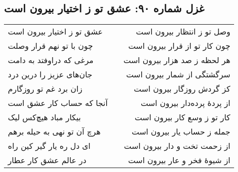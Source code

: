 \begin{center}
\section*{غزل شماره ۹۰: عشق تو ز اختیار بیرون است}
\label{sec:090}
\begin{longtable}{l p{0.5cm} r}
عشق تو ز اختیار بیرون است
&&
وصل تو ز انتظار بیرون است
\\
چون با تو نهم قرار وصلت
&&
چون کار تو از قرار بیرون است
\\
مرغی که دراوفتد به دامت
&&
هر لحظه ز صد هزار بیرون است
\\
جان‌های عزیز را درین درد
&&
سرگشتگی از شمار بیرون است
\\
زان برد غم تو روزگارم
&&
کز گردش روزگار بیرون است
\\
آنجا که حساب کار عشق است
&&
از پردهٔ پرده‌دار بیرون است
\\
بیکار مباد هیچ‌کس لیک
&&
کار تو ز وسع کار بیرون است
\\
هرچ آن تو نهی به حیله برهم
&&
جمله ز حساب یار بیرون است
\\
ای دل ره یار گیر کین راه
&&
از زحمت تخت و دار بیرون است
\\
در عالم عشق کار عطار
&&
از شیوهٔ فخر و عار بیرون است
\\
\end{longtable}
\end{center}
